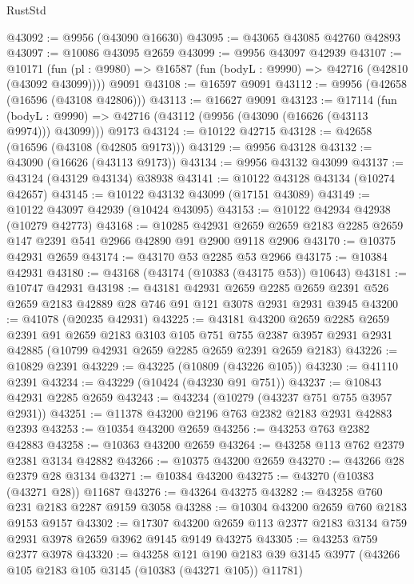 \begin{lexlean}{RustStd}
\begin{coremodule}
@43092 := @9956 (@43090 @16630)
@43095 := @43065 @43085 @42760 @42893
@43097 := @10086 @43095 @2659
@43099 := @9956 @43097 @42939
@43107 := @10171
    (fun (pl : @9980) => @16587 (fun (bodyL : @9990) => @42716 (@42810 (@43092 @43099))))
    @9091
@43108 := @16597 @9091
@43112 := @9956 (@42658 (@16596 (@43108 @42806)))
@43113 := @16627 @9091
@43123 := @17114
    (fun (bodyL : @9990) => @42716 (@43112 (@9956 (@43090 (@16626 (@43113 @9974))) @43099)))
    @9173
@43124 := @10122 @42715
@43128 := @42658 (@16596 (@43108 (@42805 @9173)))
@43129 := @9956 @43128
@43132 := @43090 (@16626 (@43113 @9173))
@43134 := @9956 @43132 @43099
@43137 := @43124 (@43129 @43134) @38938
@43141 := @10122 @43128 @43134 (@10274 @42657)
@43145 := @10122 @43132 @43099 (@17151 @43089)
@43149 := @10122 @43097 @42939 (@10424 @43095)
@43153 := @10122 @42934 @42938 (@10279 @42773)
@43168 := @10285
    @42931
    @2659
    @2659
    @2183
    @2285
    @2659
    @147
    @2391
    @541
    @2966
    @42890
    @91
    @2900
    @9118
    @2906
@43170 := @10375 @42931 @2659
@43174 := @43170 @53 @2285 @53 @2966
@43175 := @10384 @42931
@43180 := @43168 (@43174 (@10383 (@43175 @53)) @10643)
@43181 := @10747 @42931
@43198 := @43181
    @42931
    @2659
    @2285
    @2659
    @2391
    @526
    @2659
    @2183
    @42889
    @28
    @746
    @91
    @121
    @3078
    @2931
    @2931
    @3945
@43200 := @41078 (@20235 @42931)
@43225 := @43181
    @43200
    @2659
    @2285
    @2659
    @2391
    @91
    @2659
    @2183
    @3103
    @105
    @751
    @755
    @2387
    @3957
    @2931
    @2931
    @42885
    (@10799 @42931 @2659 @2285 @2659 @2391 @2659 @2183)
@43226 := @10829 @2391
@43229 := @43225 (@10809 (@43226 @105))
@43230 := @41110 @2391
@43234 := @43229 (@10424 (@43230 @91 @751))
@43237 := @10843 @42931 @2285 @2659
@43243 := @43234 (@10279 (@43237 @751 @755 @3957 @2931))
@43251 := @11378 @43200 @2196 @763 @2382 @2183 @2931 @42883 @2393
@43253 := @10354 @43200 @2659
@43256 := @43253 @763 @2382 @42883
@43258 := @10363 @43200 @2659
@43264 := @43258 @113 @762 @2379 @2381 @3134 @42882
@43266 := @10375 @43200 @2659
@43270 := @43266 @28 @2379 @28 @3134
@43271 := @10384 @43200
@43275 := @43270 (@10383 (@43271 @28)) @11687
@43276 := @43264 @43275
@43282 := @43258 @760 @231 @2183 @2287 @9159 @3058
@43288 := @10304 @43200 @2659 @760 @2183 @9153 @9157
@43302 := @17307 @43200 @2659 @113 @2377 @2183 @3134 @759 @2931 @3978 @2659 @3962 @9145 @9149 @43275
@43305 := @43253 @759 @2377 @3978
@43320 := @43258
    @121
    @190
    @2183
    @39
    @3145
    @3977
    (@43266 @105 @2183 @105 @3145 (@10383 (@43271 @105)) @11781)

\end{coremodule}
\end{lexlean}
